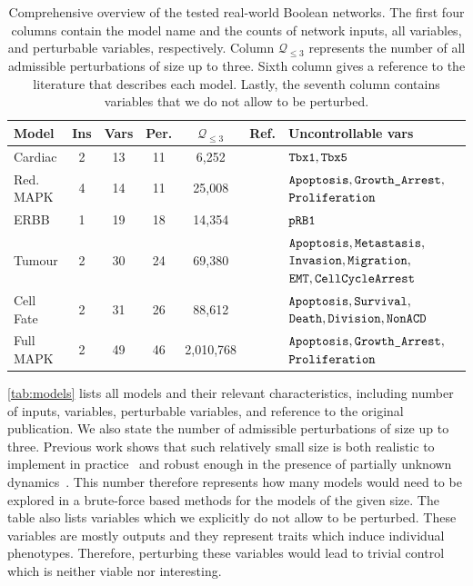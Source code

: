 \begin{table}[t]
    \caption{Comprehensive overview of the tested real-world Boolean networks. The first four columns contain the model name and the counts of network inputs, all variables, and perturbable variables, respectively. Column $\mathcal{Q}_{\leq3}$ represents the number of all admissible perturbations of size up to three. Sixth column gives a reference to the literature that describes each model. Lastly, the seventh column contains variables that we do not allow to be perturbed.}\label{tab:models}
	\setlength{\tabcolsep}{4pt}
	\vspace{10pt}
    \centering
	\footnotesize
    \begin{tabular}{|l|c|c|c|c|c|p{3.9cm}|}
    \hline
        \textbf{Model} & \textbf{Ins} & \textbf{Vars} & \textbf{Per.} & $\mathcal{Q}_{\leq3}$ & \textbf{Ref.} & \textbf{Uncontrollable vars} \\ \hline
        Cardiac & 2 & 13 & 11 & 6,252 & \cite{Herrmann2012} & $\texttt{Tbx1}, \texttt{Tbx5}$ \\ \hline
        Red. MAPK & 4 & 14 & 11 & 25,008 & \cite{Grieco2013} & $\texttt{Apoptosis}, \texttt{Growth\_Arrest},$ $ \texttt{Proliferation}$ \\ \hline
        ERBB & 1 & 19 & 18 & 14,354 & \cite{Ito2012} & $\texttt{pRB1}$ \\ \hline
        Tumour & 2 & 30 & 24 & 69,380 & \cite{Cohen2015} & $\texttt{Apoptosis}, \texttt{Metastasis},$ $ \texttt{Invasion}, \texttt{Migration},$ $ \texttt{EMT}, \texttt{CellCycleArrest} $ \\ \hline
        Cell Fate & 2 & 31 & 26 & 88,612 & \cite{Calzone2010} & $\texttt{Apoptosis}, \texttt{Survival}, $ $ \texttt{Death}, \texttt{Division}, \texttt{NonACD}$ \\ \hline
        Full MAPK & 2 & 49 & 46 & 2,010,768 & \cite{Grieco2013} & $\texttt{Apoptosis}, \texttt{Growth\_Arrest},$ $ \texttt{Proliferation}$ \\ \hline
    \end{tabular}
\end{table}

\autoref{tab:models} lists all models and their relevant characteristics, including number of inputs, variables, perturbable variables, and reference to the original publication. We also state the number of admissible perturbations of size up to three. Previous work shows that such relatively small size is both realistic to implement in practice~\cite{borriello2021,Fontanals2022b,Su2019FM} and robust enough in the presence of partially unknown dynamics~\cite{brim2022}. This number therefore represents how many models would need to be explored in a brute-force based methods for the models of the given size. The table also lists variables which we explicitly do not allow to be perturbed. These variables are mostly outputs and they represent traits which induce individual phenotypes. Therefore, perturbing these variables would lead to trivial control which is neither viable nor interesting.

